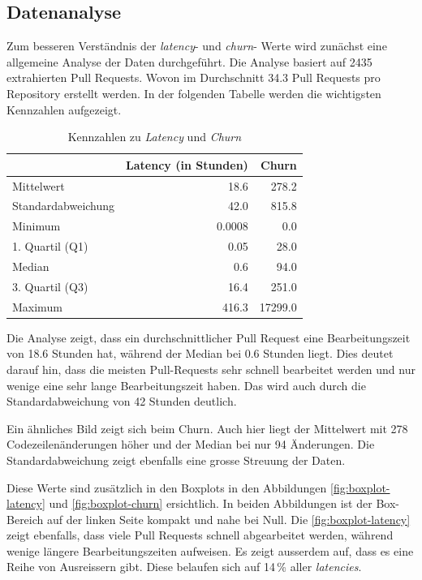 \subsection{Datenanalyse}
Zum besseren Verständnis der \textit{latency}- und \textit{churn}- Werte wird zunächst eine allgemeine Analyse der Daten durchgeführt.
Die Analyse basiert auf 2435 extrahierten Pull Requests. Wovon im Durchschnitt 34.3 Pull Requests pro Repository erstellt werden. In der folgenden Tabelle werden die wichtigsten Kennzahlen aufgezeigt.


\begin{table}[htbp]
    \centering
    \caption{Kennzahlen zu \textit{Latency} und \textit{Churn}}
    \begin{tabular}{@{}lrr@{}}
        \toprule
        \textbf & \textbf{Latency (in Stunden)} & \textbf{Churn} \\
         \midrule
        Mittelwert & 18.6 & 278.2 \\
        Standardabweichung &  42.0  & 815.8 \\
        Minimum & 0.0008 & 0.0 \\
        1. Quartil (Q1) & 0.05 & 28.0 \\
        Median & 0.6 & 94.0 \\
        3. Quartil (Q3) &  16.4   & 251.0 \\
        Maximum & 416.3 & 17299.0 \\
        \bottomrule
    \end{tabular}
    \label{tab:deskriptive-kennzahlen}
\end{table}

Die Analyse zeigt, dass ein durchschnittlicher Pull Request eine Bearbeitungszeit von 18.6 Stunden hat, während der Median bei 0.6 Stunden liegt. Dies deutet darauf hin, dass die meisten Pull-Requests sehr schnell bearbeitet werden und nur wenige eine sehr lange Bearbeitungszeit haben. Das wird auch durch die Standardabweichung von 42 Stunden deutlich.

Ein ähnliches Bild zeigt sich beim Churn. Auch hier liegt der Mittelwert mit 278 Codezeilenänderungen höher und der Median bei nur 94 Änderungen. Die Standardabweichung zeigt ebenfalls eine grosse Streuung der Daten.

Diese Werte sind zusätzlich in den Boxplots in den Abbildungen \autoref{fig:boxplot-latency} und \autoref{fig:boxplot-churn} ersichtlich. 
In beiden Abbildungen ist der Box-Bereich auf der linken Seite kompakt und nahe bei Null. 
Die \autoref{fig:boxplot-latency} zeigt ebenfalls, dass viele Pull Requests schnell abgearbeitet werden, während wenige längere Bearbeitungszeiten aufweisen. Es zeigt ausserdem auf, dass es eine Reihe von Ausreissern gibt. Diese belaufen sich auf 14\,\% aller \textit{latencies}.

